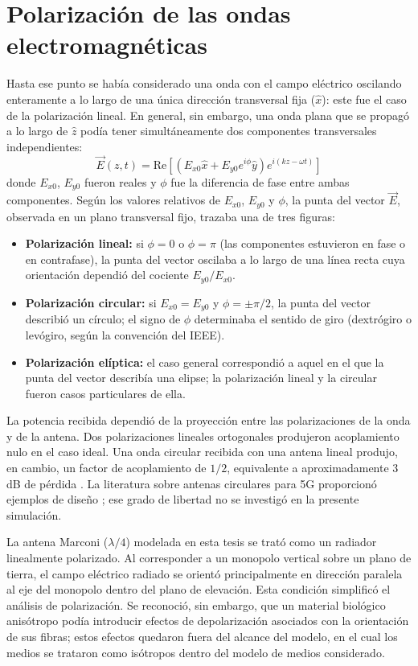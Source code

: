 \section{Polarización de las ondas electromagnéticas}
Hasta ese punto se había considerado una onda con el campo eléctrico oscilando enteramente a lo largo de una única dirección transversal fija ($\hat{x}$): este fue el caso de la polarización lineal. En general, sin embargo, una onda plana que se propagó a lo largo de $\hat{z}$ podía tener simultáneamente dos componentes transversales independientes:
\begin{equation}
    \vec{E}(z, t) = \text{Re}\left[\left(E_{x0}\hat{x} + E_{y0}e^{i\phi}\hat{y}\right)e^{i(kz-\omega t)}\right]
\end{equation}
donde $E_{x0}$, $E_{y0}$ fueron reales y $\phi$ fue la diferencia de fase entre ambas componentes. Según los valores relativos de $E_{x0}$, $E_{y0}$ y $\phi$, la punta del vector $\vec{E}$, observada en un plano transversal fijo, trazaba una de tres figuras:
\begin{itemize}
    \item \textbf{Polarización lineal:} si $\phi=0$ o $\phi=\pi$ (las componentes estuvieron en fase o en contrafase), la punta del vector oscilaba a lo largo de una línea recta cuya orientación dependió del cociente $E_{y0}/E_{x0}$.
    \item \textbf{Polarización circular:} si $E_{x0}=E_{y0}$ y $\phi=\pm\pi/2$, la punta del vector describió un círculo; el signo de $\phi$ determinaba el sentido de giro (dextrógiro o levógiro, según la convención del IEEE).
    \item \textbf{Polarización elíptica:} el caso general correspondió a aquel en el que la punta del vector describía una elipse; la polarización lineal y la circular fueron casos particulares de ella.
\end{itemize}

La potencia recibida dependió de la proyección entre las polarizaciones de la onda y de la antena. Dos polarizaciones lineales ortogonales produjeron acoplamiento nulo en el caso ideal. Una onda circular recibida con una antena lineal produjo, en cambio, un factor de acoplamiento de $1/2$, equivalente a aproximadamente 3 dB de pérdida \citep{Balanis2016}. La literatura sobre antenas circulares para 5G proporcionó ejemplos de diseño \citep{Mohammadkhani2023}; ese grado de libertad no se investigó en la presente simulación.

La antena Marconi ($\lambda/4$) modelada en esta tesis se trató como un radiador linealmente polarizado. Al corresponder a un monopolo vertical sobre un plano de tierra, el campo eléctrico radiado se orientó principalmente en dirección paralela al eje del monopolo dentro del plano de elevación. Esta condición simplificó el análisis de polarización. Se reconoció, sin embargo, que un material biológico anisótropo podía introducir efectos de depolarización asociados con la orientación de sus fibras; estos efectos quedaron fuera del alcance del modelo, en el cual los medios se trataron como isótropos dentro del modelo de medios considerado.

